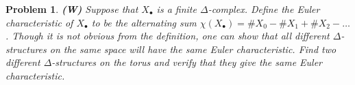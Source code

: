 
\usepackage[T1]{fontenc}


\usepackage{thmtools}
\usepackage{fancyhdr}
\usepackage{csquotes}
\newsavebox{\myheadbox}
{
\cfoot{\thepage}
}
\fancyhf{}
{
\cfoot{\thepage}
}

\pagestyle{normalpage}

\date{}

\newcommand{\Set}{\mathsf{Set}}
\renewcommand{\C}{\mathsf{C}}

\thispagestyle{firstpage}
\theoremstyle{normalhead}
\newtheorem{problem}{Problem}
\newtheorem{lemma}{Lemma}

\begin{problem}
\textbf{(W)} Suppose that $X_\bullet$ is a finite $\Delta$-complex. Define the \emph{Euler characteristic} of $X_\bullet$ to be the alternating sum $\chi(X_\bullet) = \# X_0-\#X_1+\#X_2-\ldots$. Though it is not obvious from the definition, one can show that all different $\Delta$-structures on the same space will have the same Euler characteristic. Find two different $\Delta$-structures on the torus and verify that they give the same Euler characteristic.
\end{problem}

